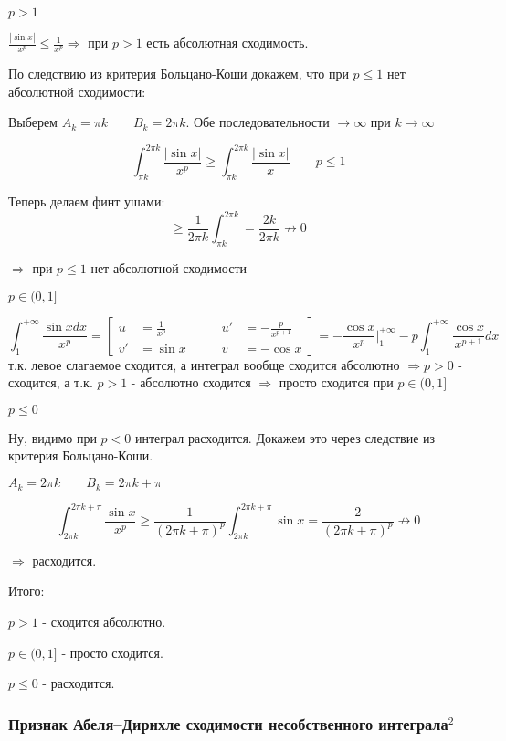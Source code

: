 \documentclass{article}
\begin{document}
$p > 1$

    $\frac{|\sin x|}{x^p} \leq \frac{1}{x^p} \Rightarrow$ при $p > 1$ есть абсолютная сходимость.

    По следствию из критерия Больцано-Коши докажем, что при $p \leq 1$ нет абсолютной сходимости:

    Выберем $A_k = \pi k \qquad B_k = 2\pi k$. Обе последовательности $\to \infty$ при $k \to \infty$

    $$
    \int_{\pi k} ^ {2\pi k} \frac {|\sin x|} {x^p} \geq \int _{\pi k} ^ {2 \pi k} \frac{|\sin{x}|}{x} \qquad p \leq 1
    $$

    Теперь делаем финт ушами: 
    $$
    \geq \frac{1}{2\pi k} \int_{\pi k} ^ {2\pi k} = \frac{2k}{2\pi k} \nrightarrow 0
    $$

    $\Rightarrow $ при $p \leq 1$ нет абсолютной сходимости

$p \in (0 ,1]$

    $$
    \int_{1}^{+\infty}\frac{\sin{x} dx} {x^p} = 
    \left[
        \begin{alignedat} {2}
            u &= \frac{1}{x^p} \qquad &u' &= -\frac{p}{x^{p+1}} \\
            v' &= \sin{x} \qquad &v &= -\cos{x}
        \end{alignedat}
    \right]
    = -\frac{\cos{x}}{x^p} |_{1}^{+\infty} - p \int _{1}^{+\infty} \frac{\cos{x}}{x^{p + 1}} dx 
    $$
    т.к. левое слагаемое сходится, а интеграл вообще сходится абсолютно $\Rightarrow p > 0$ - сходится, а т.к. $p > 1$ - абсолютно сходится $\Rightarrow$ просто сходится при $p \in (0, 1]$

$p \leq 0$

    Ну, видимо при $p < 0$ интеграл расходится. Докажем это через следствие из критерия Больцано-Коши.

$A_k = 2\pi k \qquad B_k = 2\pi k + \pi$

$$
\int_{2\pi k}^{2\pi k + \pi} \frac{\sin{x}}{x^p} \geq \frac{1}{(2\pi k + \pi)^p} \int_{2\pi k} ^ {2\pi k + \pi} \sin{x} = \frac{2}{(2\pi k + \pi)^p} \nrightarrow 0
$$

$\Rightarrow$ расходится.

Итого:

$p > 1$ - сходится абсолютно.

$p \in (0, 1]$ - просто сходится.

$p \leq 0$ - расходится.

\subsubsection{Признак Абеля--Дирихле сходимости несобственного интеграла\texorpdfstring{$^2$}{}}
\end{document}

